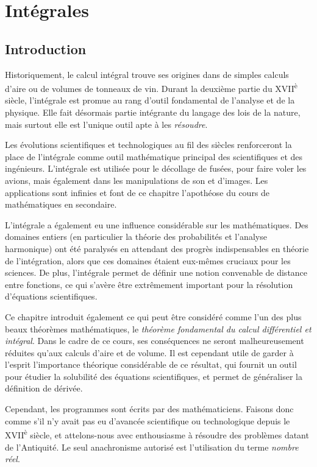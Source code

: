 \documentclass[main.tex]{subfiles}
\begin{document}
\chapter{Intégrales}

\section{Introduction}

Historiquement,
le calcul intégral trouve ses origines dans de simples calculs d'aire ou de volumes de tonneaux de vin.
Durant la deuxième partie du XVII\textsuperscript{è} siècle,
l'intégrale est promue au rang d'outil fondamental de l'analyse et de la physique.
Elle fait désormais partie intégrante du langage des lois de la nature,
mais surtout elle est l'unique outil apte à les \emph{résoudre}.

Les évolutions scientifiques et technologiques au fil des siècles
renforceront la place de l'intégrale comme outil mathématique principal des scientifiques et des ingénieurs.
L'intégrale est utilisée pour le décollage de fusées, pour faire voler les avions,
mais également dans les manipulations de son et d'images.
Les applications sont infinies et font de ce chapitre l'apothéose du cours de mathématiques en secondaire.

L'intégrale a également eu une influence considérable sur les mathématiques.
Des domaines entiers (en particulier la théorie des probabilités et l'analyse harmonique)
ont été paralysés en attendant des progrès indispensables en théorie de l'intégration,
alors que ces domaines étaient eux-mêmes cruciaux pour les sciences.
De plus, l'intégrale permet de définir une notion convenable de distance entre fonctions,
ce qui s'avère être extrêmement important pour la résolution d'équations scientifiques.

Ce chapitre introduit également ce qui peut être considéré comme l'un des plus beaux théorèmes mathématiques,
le \emph{théorème fondamental du calcul différentiel et intégral}.
Dans le cadre de ce cours,
ses conséquences ne seront malheureusement réduites qu'aux calculs d'aire et de volume.
Il est cependant utile de garder à l'esprit l'importance théorique considérable de ce résultat,
qui fournit un outil pour étudier la solubilité des équations scientifiques,
et permet de généraliser la définition de dérivée.

Cependant, les programmes sont écrits par des mathématiciens.
Faisons donc comme s'il n'y avait pas eu d'avancée scientifique ou technologique depuis le XVII\textsuperscript{è} siècle,
et attelons-nous avec enthousiasme à résoudre des problèmes datant de l'Antiquité.
Le seul anachronisme autorisé est l'utilisation du terme \emph{nombre réel}.
\end{document}
